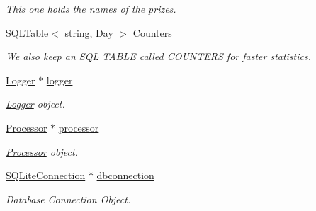 \begin{CompactItemize}
\begin{CompactList}\small\item\em This one holds the names of the prizes.\item\end{CompactList}\item 
\hyperlink{classSQLTable}{SQLTable}$<$ string, \hyperlink{classDay}{Day} $>$ \hyperlink{classContest_Contestm13}{Counters}
\begin{CompactList}\small\item\em We also keep an SQL TABLE called COUNTERS for faster statistics.\item\end{CompactList}\item 
\hyperlink{classLogger}{Logger} $\ast$ \hyperlink{classContest_Contestm14}{logger}
\begin{CompactList}\small\item\em \hyperlink{classLogger}{Logger} object.\item\end{CompactList}\item 
\hyperlink{classProcessor}{Processor} $\ast$ \hyperlink{classContest_Contestm15}{processor}
\begin{CompactList}\small\item\em \hyperlink{classProcessor}{Processor} object.\item\end{CompactList}\item 
\hyperlink{classSQLiteConnection}{SQLite\-Connection} $\ast$ \hyperlink{classContest_Contestm16}{dbconnection}
\begin{CompactList}\small\item\em Database Connection Object.\item\end{CompactList}\end{CompactItemize}

